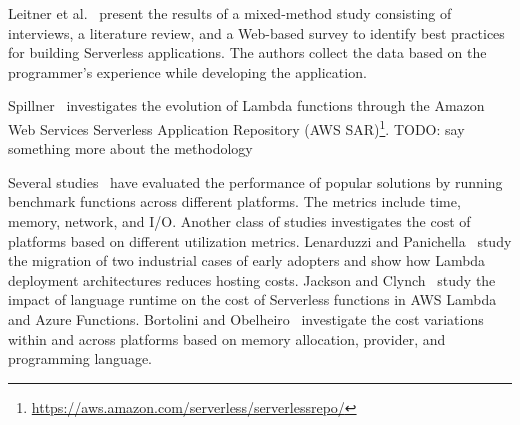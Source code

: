 Leitner et al.~\cite{leitner2019mixed} present the results of a mixed-method 
study consisting of interviews, a literature review, and a Web-based survey 
to identify best practices for building Serverless applications. 
The authors collect the data based on the programmer's experience while 
developing the application. 

Spillner~\cite{spillner2019quantitative} investigates the 
evolution of Lambda functions through the Amazon Web Services 
Serverless Application Repository
(AWS SAR)\footnote{\url{https://aws.amazon.com/serverless/serverlessrepo/}}. 
TODO: say something more about the methodology


Several studies~\cite{wang2018peeking,lloyd2018serverless,figiela2018performance,lee2018evaluation,mcgrath2017serverless,back2018using,mohanty2018evaluation} 
have evaluated the performance of popular \faas solutions by running 
benchmark functions across different platforms. The metrics include time, 
memory, network, and I/O. Another class of studies investigates the cost of \faas platforms 
based on different utilization metrics. Lenarduzzi and Panichella~\cite{adzic2017serverless} 
study the migration of two industrial cases of early adopters
and show how Lambda deployment architectures reduces hosting costs. 
Jackson and Clynch~\cite{jackson2018investigation} study the impact of 
language runtime on the cost of Serverless functions in AWS Lambda and 
Azure Functions. Bortolini and Obelheiro~\cite{bortolini2019investigating} 
investigate the cost variations within and across \faas platforms 
based on memory allocation, \faas provider, and 
programming language. 



